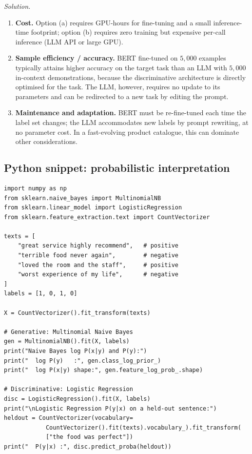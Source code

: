 \textit{Solution.}
\begin{enumerate}
    \item \textbf{Cost.} Option (a) requires GPU-hours for fine-tuning and a small inference-time footprint; option (b) requires zero training but expensive per-call inference (LLM API or large GPU).
    \item \textbf{Sample efficiency / accuracy.} BERT fine-tuned on $5{,}000$ examples typically attains higher accuracy on the target task than an LLM with $5{,}000$ in-context demonstrations, because the discriminative architecture is directly optimised for the task. The LLM, however, requires no update to its parameters and can be redirected to a new task by editing the prompt.
    \item \textbf{Maintenance and adaptation.} BERT must be re-fine-tuned each time the label set changes; the LLM accommodates new labels by prompt rewriting, at no parameter cost. In a fast-evolving product catalogue, this can dominate other considerations.
\end{enumerate}

\subsection{Python snippet: probabilistic interpretation}

\begin{lstlisting}
import numpy as np
from sklearn.naive_bayes import MultinomialNB
from sklearn.linear_model import LogisticRegression
from sklearn.feature_extraction.text import CountVectorizer

texts = [
    "great service highly recommend",   # positive
    "terrible food never again",        # negative
    "loved the room and the staff",     # positive
    "worst experience of my life",      # negative
]
labels = [1, 0, 1, 0]

X = CountVectorizer().fit_transform(texts)

# Generative: Multinomial Naive Bayes
gen = MultinomialNB().fit(X, labels)
print("Naive Bayes log P(x|y) and P(y):")
print("  log P(y)   :", gen.class_log_prior_)
print("  log P(x|y) shape:", gen.feature_log_prob_.shape)

# Discriminative: Logistic Regression
disc = LogisticRegression().fit(X, labels)
print("\nLogistic Regression P(y|x) on a held-out sentence:")
heldout = CountVectorizer(vocabulary=
            CountVectorizer().fit(texts).vocabulary_).fit_transform(
            ["the food was perfect"])
print("  P(y|x) :", disc.predict_proba(heldout))
\end{lstlisting}

